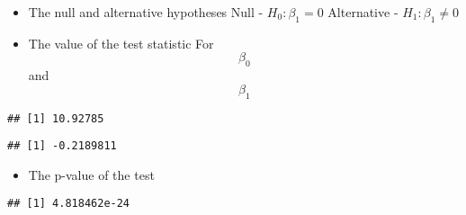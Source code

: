 \documentclass[
]{article}
\newenvironment{Shaded}{\begin{snugshade}}{\end{snugshade}}
\newcommand{\DecValTok}[1]{\textcolor[rgb]{0.00,0.00,0.81}{#1}}
\newcommand{\FunctionTok}[1]{\textcolor[rgb]{0.00,0.00,0.00}{#1}}
\newcommand{\NormalTok}[1]{#1}
\newcommand{\SpecialCharTok}[1]{\textcolor[rgb]{0.00,0.00,0.00}{#1}}
\providecommand{\tightlist}{%
  \setlength{\itemsep}{0pt}\setlength{\parskip}{0pt}}
\begin{document}
\begin{itemize}
\item
  The null and alternative hypotheses Null - \(H_0: \beta_1 = 0\)
  Alternative - \(H_1: \beta_1 \neq 0\)
\item
  The value of the test statistic For \[\beta_0\] and \[\beta_1\]
\end{itemize}

\begin{Shaded}
\end{Shaded}

\begin{verbatim}
## [1] 10.92785
\end{verbatim}

\begin{Shaded}
\end{Shaded}

\begin{verbatim}
## [1] -0.2189811
\end{verbatim}

\begin{itemize}
\tightlist
\item
  The p-value of the test
\end{itemize}

\begin{Shaded}
\end{Shaded}

\begin{verbatim}
## [1] 4.818462e-24
\end{verbatim}

\begin{Shaded}
\end{Shaded}
\end{document}
